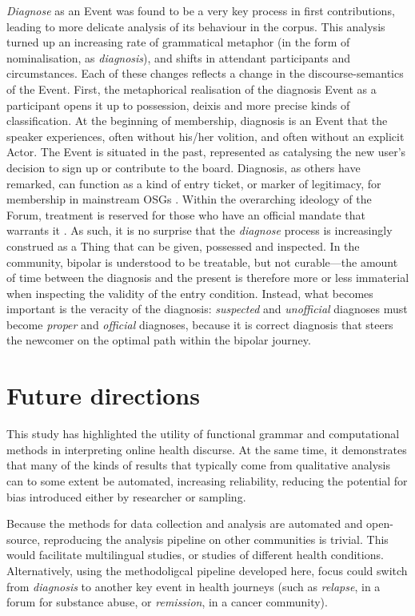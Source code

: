 \documentclass{article}
\renewcommand{\cite}{\parencite}
\begin{document}
{\emph{Diagnose} as an Event was found to be a very key process in first contributions, leading to more delicate analysis of its behaviour in the corpus. This analysis turned up an increasing rate of grammatical metaphor (in the form of nominalisation, as \emph{diagnosis}), and shifts in attendant participants and circumstances. Each of these changes reflects a change in the discourse-semantics of the Event. First, the metaphorical realisation of the diagnosis Event as a participant opens it up to possession, deixis and more precise kinds of classification. At the beginning of membership, diagnosis is an Event that the speaker experiences, often without his\slash her volition, and often without an explicit Actor. The Event is situated in the past, represented as catalysing the new user's decision to sign up or contribute to the board. Diagnosis, as others have remarked, can function as a kind of entry ticket, or marker of legitimacy, for membership in mainstream OSGs \cite{stommel_use_2011}. Within the overarching ideology of the Forum, treatment \cite[including the talk therapy provided by Forum interaction itself---see][]{kaufman2016producing} is reserved for those who have an official mandate that warrants it \cite{vayreda_social_2009}. As such, it is no surprise that the \emph{diagnose} process is increasingly construed as a Thing that can be given, possessed and inspected. In the community, bipolar is understood to be treatable, but not curable---the amount of time between the diagnosis and the present is therefore more or less immaterial when inspecting the validity of the entry condition. Instead, what becomes important is the veracity of the diagnosis: \emph{suspected} and \emph{unofficial} diagnoses must become \emph{proper} and \emph{official} diagnoses, because it is correct diagnosis that steers the newcomer on the optimal path within the bipolar journey.

\section{Future directions}

This study has highlighted the utility of functional grammar and computational methods in interpreting online health discurse. At the same time, it demonstrates that many of the kinds of results that typically come from qualitative analysis can to some extent be automated, increasing reliability, reducing the potential for bias introduced either by researcher or sampling.

Because the methods for data collection and analysis are automated and open-source, reproducing the analysis pipeline on other communities is trivial. This would facilitate multilingual studies, or studies of different health conditions. Alternatively, using the methodoligcal pipeline developed here, focus could switch from \emph{diagnosis} to another key event in health journeys (such as \emph{relapse}, in a forum for substance abuse, or \emph{remission}, in a cancer community).

}
\end{document}
